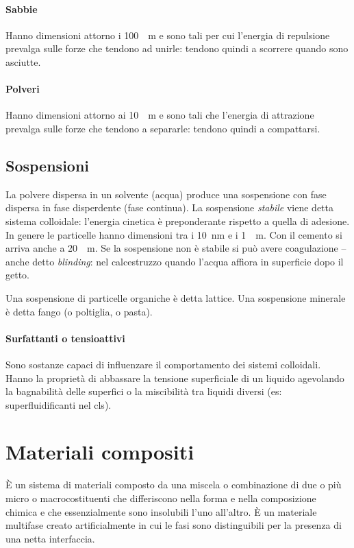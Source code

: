 \documentclass[a5paper,12pt]{article}
\newcommand{\e}{\`E\xspace}  %
\begin{document}
\paragraph{Sabbie} Hanno dimensioni attorno i \SI{100}{\mu m} e sono tali per cui l'energia di repulsione prevalga sulle forze che tendono ad unirle: tendono quindi a scorrere quando sono asciutte.
\paragraph{Polveri} Hanno dimensioni attorno ai \SI{10}{\mu m} e sono tali che l'energia di attrazione prevalga sulle forze che tendono a separarle: tendono quindi a compattarsi.
\subsection{Sospensioni}
La polvere dispersa in un solvente (acqua) produce una sospensione con fase dispersa in fase disperdente (fase continua).
La sospensione \emph{stabile} viene detta sistema colloidale: l'energia cinetica è preponderante rispetto a quella di adesione. In genere le particelle hanno dimensioni tra i \SI{10}{nm} e i \SI{1}{\mu m}. Con il cemento si arriva anche a \SI{20}{\mu m}.
Se la sospensione non è stabile si può avere coagulazione -- anche detto \emph{blinding}: nel calcestruzzo quando l'acqua affiora in superficie dopo il getto.

Una sospensione di particelle organiche è detta lattice. Una sospensione minerale è detta fango (o poltiglia, o pasta).
\paragraph{Surfattanti o tensioattivi} Sono sostanze capaci di influenzare il comportamento dei sistemi colloidali. Hanno la proprietà di abbassare la tensione superficiale di un liquido agevolando la bagnabilità delle superfici o la miscibilità tra liquidi diversi (es: superfluidificanti nel cls).
\section{Materiali compositi}
\e un sistema di materiali composto da una miscela o combinazione di due o più micro o macrocostituenti che differiscono nella forma e nella composizione chimica e che essenzialmente sono insolubili l'uno all'altro. 
\e  un materiale multifase creato artificialmente in cui le fasi sono distinguibili per la presenza di 
una netta interfaccia. 
\end{document}
